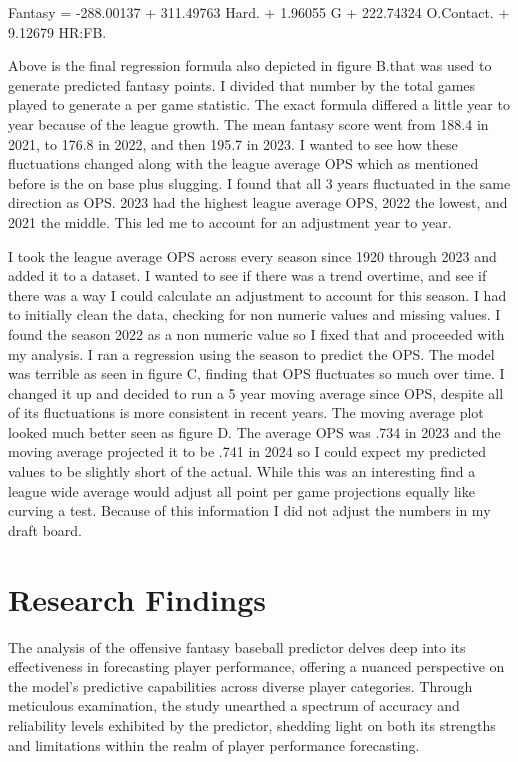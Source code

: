 \documentclass[12pt, english]{article}
\begin{document}
Fantasy = -288.00137 + 311.49763 \times Hard. + 1.96055 \times G + 222.74324 \times O.Contact. + 9.12679 \times HR:FB.

Above is the final regression formula also depicted in figure B.that was used to generate predicted fantasy points. I divided that number by the total games played to generate a per game statistic. The exact formula differed a little year to year because of the league growth. The mean fantasy score went from 188.4 in 2021, to 176.8 in 2022, and then 195.7 in 2023. I wanted to see how these fluctuations changed along with the league average OPS which as mentioned before is the on base plus slugging. I found that all 3 years fluctuated in the same direction as OPS. 2023 had the highest league average OPS, 2022 the lowest, and 2021 the middle. This led me to account for an adjustment year to year.

I took the league average OPS across every season since 1920 through 2023 and added it to a dataset. I wanted to see if there was a trend overtime, and see if there was a way I could calculate an adjustment to account for this season. I had to initially clean the data, checking for non numeric values and missing values. I found the season 2022 as a non numeric value so I fixed that and proceeded with my analysis. I ran a regression using the season to predict the OPS. The model was terrible as seen in figure C, finding that OPS fluctuates so much over time. I changed it up and decided to run a 5 year moving average since OPS, despite all of its fluctuations is more consistent in recent years. The moving average plot looked much better seen as figure D. The average OPS was .734 in 2023 and the moving average projected it to be .741 in 2024 so I could expect my predicted values to be slightly short of the actual. While this was an interesting find a league wide average would adjust all point per game projections equally like curving a test. Because of this information I did not adjust the numbers in my draft board.

\section{Research Findings}

The analysis of the offensive fantasy baseball predictor delves deep into its effectiveness in forecasting player performance, offering a nuanced perspective on the model's predictive capabilities across diverse player categories. Through meticulous examination, the study unearthed a spectrum of accuracy and reliability levels exhibited by the predictor, shedding light on both its strengths and limitations within the realm of player performance forecasting.
\end{document}
